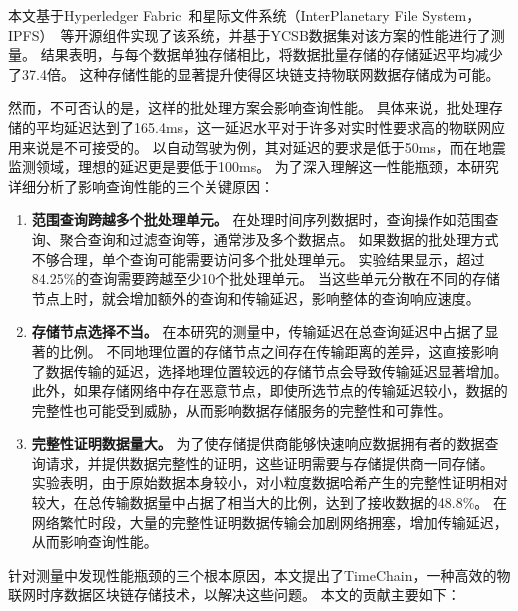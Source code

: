 本文基于Hyperledger Fabric~\cite{hyperledger}和星际文件系统（InterPlanetary File System，IPFS）~\cite{benet2014ipfs}等开源组件实现了该系统，并基于YCSB数据集对该方案的性能进行了测量。
结果表明，与每个数据单独存储相比，将数据批量存储的存储延迟平均减少了37.4倍。
这种存储性能的显著提升使得区块链支持物联网数据存储成为可能。

然而，不可否认的是，这样的批处理方案会影响查询性能。
具体来说，批处理存储的平均延迟达到了165.4ms，这一延迟水平对于许多对实时性要求高的物联网应用来说是不可接受的。
以自动驾驶为例，其对延迟的要求是低于50ms，而在地震监测领域，理想的延迟更是要低于100ms。
为了深入理解这一性能瓶颈，本研究详细分析了影响查询性能的三个关键原因：

\begin{enumerate}
    \item \textbf{范围查询跨越多个批处理单元。}
    在处理时间序列数据时，查询操作如范围查询、聚合查询和过滤查询等，通常涉及多个数据点。
    如果数据的批处理方式不够合理，单个查询可能需要访问多个批处理单元。
    实验结果显示，超过84.25\%的查询需要跨越至少10个批处理单元。
    当这些单元分散在不同的存储节点上时，就会增加额外的查询和传输延迟，影响整体的查询响应速度。
    
    \item \textbf{存储节点选择不当。}
    在本研究的测量中，传输延迟在总查询延迟中占据了显著的比例。
    不同地理位置的存储节点之间存在传输距离的差异，这直接影响了数据传输的延迟，选择地理位置较远的存储节点会导致传输延迟显著增加。
    此外，如果存储网络中存在恶意节点，即使所选节点的传输延迟较小，数据的完整性也可能受到威胁，从而影响数据存储服务的完整性和可靠性。

    \item \textbf{完整性证明数据量大。}
    为了使存储提供商能够快速响应数据拥有者的数据查询请求，并提供数据完整性的证明，这些证明需要与存储提供商一同存储。
    实验表明，由于原始数据本身较小，对小粒度数据哈希产生的完整性证明相对较大，在总传输数据量中占据了相当大的比例，达到了接收数据的48.8\%。
    在网络繁忙时段，大量的完整性证明数据传输会加剧网络拥塞，增加传输延迟，从而影响查询性能。
\end{enumerate}

针对测量中发现性能瓶颈的三个根本原因，本文提出了TimeChain，一种高效的物联网时序数据区块链存储技术，以解决这些问题。
本文的贡献主要如下：

